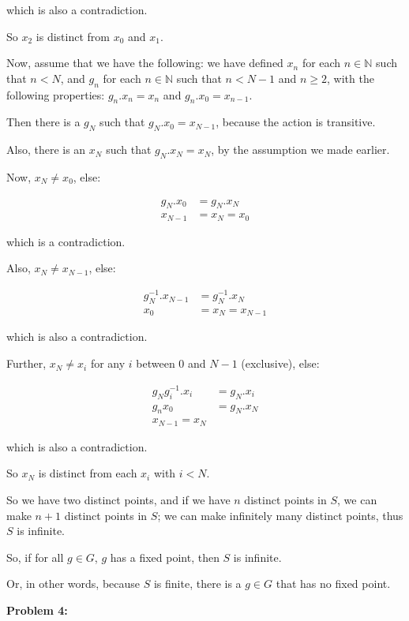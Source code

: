\documentclass[a4paper,12pt]{article}
\newcommand{\tab}{\hspace{4mm}} %
\newcommand{\shunt}{\vspace{20mm}}
\newcommand{\N}{\mathbb{N}}
\begin{document}
\tab which is also a contradiction.

\tab So $x_2$ is distinct from $x_0$ and $x_1$.

\tab Now, assume that we have the following: we have defined $x_n$ for each $n \in \N$ such that $n < N$, and $g_n$ for each $n \in \N$ such that $n < N-1$ and $n \geq 2$, with the following properties: $g_n.x_n = x_n$ and $g_n.x_0 = x_{n-1}$.

\tab Then there is a $g_N$ such that $g_N.x_0 = x_{N-1}$, because the action is transitive.

\tab Also, there is an $x_N$ such that $g_N.x_N = x_N$, by the assumption we made earlier.

\tab Now, $x_N \neq x_0$, else:

\begin{align*}
g_N.x_0 &= g_N.x_N\\
x_{N-1}&= x_N=x_0
\end{align*}

\tab which is a contradiction.

\tab Also, $x_N \neq x_{N-1}$, else:

\begin{align*}
g_N^{-1}.x_{N-1} &= g_N^{-1}.x_N\\
x_0&= x_N=x_{N-1}
\end{align*} 

\tab which is also a contradiction.

\tab Further, $x_N \neq x_{i}$ for any $i$ between $0$ and $N-1$ (exclusive), else:

\begin{align*}
g_Ng_i^{-1}.x_i &= g_N.x_i\\
g_nx_0 &= g_N.x_N\\
x_{N-1} = x_N
\end{align*} 

\tab which is also a contradiction.

\tab So $x_N$ is distinct from each $x_i$ with $i < N$.

\tab So we have two distinct points, and if we have $n$ distinct points in $S$, we can make $n+1$ distinct points in $S$; we can make infinitely many distinct points, thus $S$ is infinite.

So, if for all $g \in G$, $g$ has a fixed point, then $S$ is infinite.

Or, in other words, because $S$ is finite, there is a $g \in G$ that has no fixed point.

\shunt

{\bf Problem 4:}
\end{document}
